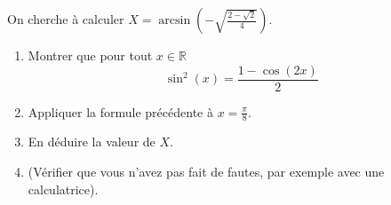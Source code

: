 \documentclass[a4paper,12pt]{article}
\begin{document}
\Exo {$\boldsymbol{\arcsin}$}

On cherche à calculer $X = \displaystyle \arcsin\left( - \sqrt{\frac{2 - \sqrt{2}}{4}}\right)$. 
\begin{enumerate}
\item Montrer que pour tout $x \in \mathbb{R}$
  \begin{equation*}
    \sin^2(x)  = \frac{1 - \cos(2x)}{2}
  \end{equation*}
\item Appliquer la formule précédente à $x = \frac{\pi}{8}$. 
\item En déduire la valeur de $X$. 
\item (Vérifier que vous n'avez pas fait de fautes, par exemple avec une calculatrice). 
\end{enumerate}
\end{document}
